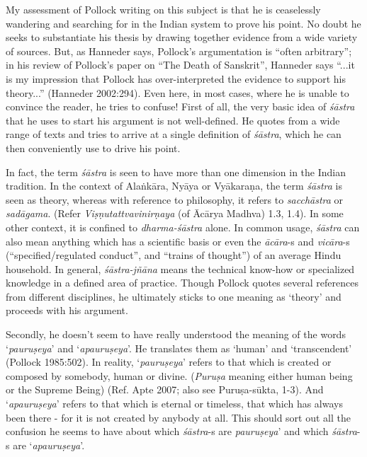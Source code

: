 My assessment of Pollock writing on this subject is that he is ceaselessly wandering and searching for in the Indian system to prove his point. No doubt he seeks to substantiate his thesis by drawing together evidence from a wide variety of sources. But, as Hanneder says, Pollock's argumentation is ``often arbitrary''; in his review of Pollock's paper on ``The Death of Sanskrit'', Hanneder says ``...it is my impression that Pollock has over-interpreted the evidence to support his theory...'' (Hanneder 2002:294). Even here, in most cases, where he is unable to convince the reader, he tries to confuse! First of all, the very basic idea of {\it śāstra} that he uses to start his argument is not well-defined. He quotes from a wide range of texts and tries to arrive at a single definition of {\it śāstra}, which he can then conveniently use to drive his point. 

In fact, the term {\it śāstra} is seen to have more than one dimension in the Indian tradition. In the context of Alaṅkāra, Nyāya or Vyākaraṇa, the term {\it śāstra} is seen as theory, whereas with reference to philosophy, it refers to {\it sacchāstra} or {\it sadāgama}. (Refer {\it Viṣṇutattvavinirṇaya} (of Ācārya Madhva) 1.3, 1.4).  In some other context, it is confined to {\it dharma-śāstra} alone. In common usage, {\it śāstra} can also mean anything which has a scientific basis or even the {\it ācāra}-s and {\it vicāra}-s (``specified/regulated conduct'', and ``trains of thought'') of an average Hindu household. In general, {\sl śāstra-jñāna} means the technical know-how or specialized knowledge in a defined area of practice. Though Pollock quotes several references from different disciplines, he ultimately sticks to one meaning as `theory' and proceeds with his argument. 

Secondly, he doesn't seem to have really understood the meaning of the words `{\it pauruṣeya}' and `{\it apauruṣeya}'. He translates them as `human' and `transcendent' (Pollock 1985:502). In reality, `{\it pauruṣeya}' refers to that which is created or composed by somebody, human or divine. ({\it Puruṣa} meaning either human being or the Supreme Being) (Ref. Apte 2007; also see Puruṣa-sūkta, 1-3). And `{\it apauruṣeya}' refers to that which is eternal or timeless, that which has always been there - for it is not created by anybody at all. This should sort out all the confusion he seems to have about which {\it śāstra}-s are {\it pauruṣeya}' and which {\it śāstra}-s are `{\it apauruṣeya}'. 

